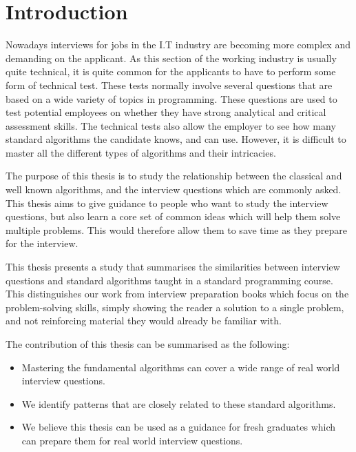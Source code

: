 \documentclass[10pt,twocolumn,hidelinks]{IEEEtran}
\begin{document}
\section{Introduction}
\label{sec:intro}
\par
Nowadays interviews for jobs in the I.T industry are becoming more complex and demanding on the applicant. As this section of the working industry is usually quite technical, it is quite common for the applicants to have to perform some form of technical test. These tests normally involve several questions that are based on a wide variety of topics in programming. These questions are used to test potential employees on whether they have strong analytical and critical assessment skills. The technical tests also allow the employer to see how many standard algorithms the candidate knows, and can use. However, it is difficult to master all the different types of algorithms and their intricacies. 
\par The purpose of this thesis is to study the relationship between the classical and well known algorithms, and the interview questions which are commonly asked.  This thesis aims to give guidance to people who want to study the interview questions, but also learn a core set of common ideas which will help them solve multiple problems. This would therefore allow them to save time as they prepare for the interview.
\par This thesis presents a study that summarises the similarities between interview questions and standard algorithms taught in a standard programming course. This distinguishes our work from interview preparation books which focus on the problem-solving skills, simply showing the reader a solution to a single problem, and not reinforcing material they would already be familiar with. 
\par The contribution of this thesis can be summarised as the following: 
\begin{itemize}
\item Mastering the fundamental algorithms can cover a wide range of real world interview questions. 
\item We identify patterns that are closely related to these standard algorithms. 
\item We believe this thesis can be used as a guidance for fresh graduates which can prepare them for real world interview questions.  
\end{itemize}
\end{document}
